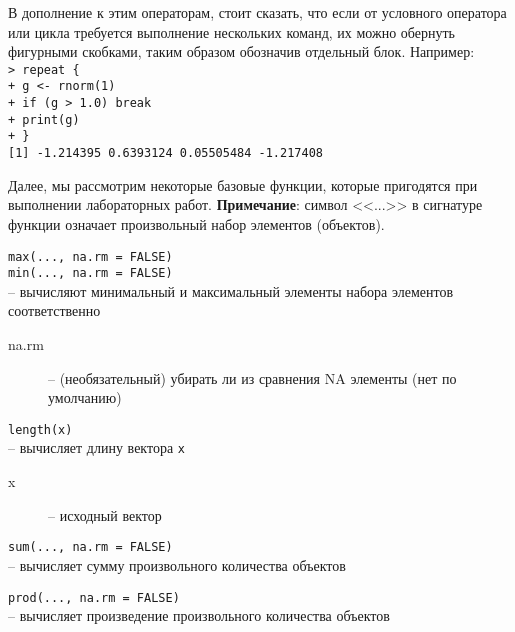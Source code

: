     В дополнение к этим операторам, стоит сказать, что если от условного оператора или цикла
    требуется выполнение нескольких команд, их можно обернуть фигурными скобками, таким 
    образом обозначив отдельный блок. Например: \\
    \indent\texttt{> repeat \{} \\
    \indent\texttt{+ g <- rnorm(1)} \\
    \indent\texttt{+ if (g > 1.0) break} \\ 
    \indent\texttt{+ print(g)} \\
    \indent\texttt{+ \}} \\
    \indent\texttt{[1] -1.214395 0.6393124 0.05505484 -1.217408} 

    Далее, мы рассмотрим некоторые базовые функции, которые пригодятся при выполнении 
    лабораторных работ. \textbf{Примечание}: символ <<...>> в сигнатуре функции означает
    произвольный набор элементов (объектов).
    \begin{mdframed}[style=BadassFrame]
        \texttt{max(..., na.rm = FALSE) \\ min(..., na.rm = FALSE)} \\
        -- вычисляют минимальный и максимальный элементы набора элементов соответственно
        \begin{description}
            \item[na.rm] -- (необязательный) убирать ли из сравнения NA элементы (нет по 
                умолчанию)
        \end{description}
    \end{mdframed}

    \begin{mdframed}[style=BadassFrame]
        \texttt{length(x)} \\
        -- вычисляет длину вектора \texttt{x}
        \begin{description}
           \item[x] -- исходный вектор
        \end{description}
    \end{mdframed}
 
    \begin{mdframed}[style=BadassFrame]
        \texttt{sum(..., na.rm = FALSE)} \\
        -- вычисляет сумму произвольного количества объектов 
    \end{mdframed}

    \begin{mdframed}[style=BadassFrame]
        \texttt{prod(..., na.rm = FALSE)} \\
        -- вычисляет произведение произвольного количества объектов 
    \end{mdframed}

